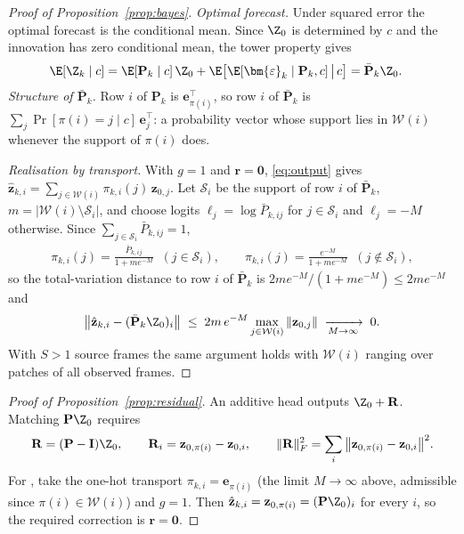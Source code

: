 \begin{proof}[Proof of Proposition~\ref{prop:bayes}]
\emph{Optimal forecast.} Under squared error the optimal forecast is the conditional mean. Since $\Z_0$ is determined
by $c$ and the innovation has zero conditional mean, the tower property gives
\begin{align}
\E[\Z_k\mid c]
  &= \E[\mathbf{P}_k\mid c]\,\Z_0+\E\big[\E[\bm{\varepsilon}_k\mid\mathbf{P}_k,c]\,\big|\,c\big]
   = \bar{\mathbf{P}}_k\Z_0 .
\end{align}
\emph{Structure of $\bar{\mathbf{P}}_k$.} Row $i$ of $\mathbf{P}_k$ is $\mathbf{e}_{\pi(i)}^{\top}$, so row $i$ of
$\bar{\mathbf{P}}_k$ is $\sum_{j}\Pr[\pi(i)=j\mid c]\,\mathbf{e}_j^{\top}$: a probability vector whose support lies in
$\mathcal{W}(i)$ whenever the support of $\pi(i)$ does.

\emph{Realisation by transport.} With $g=1$ and $\mathbf{r}=\mathbf{0}$, \cref{eq:output} gives
$\hat{\mathbf{z}}_{k,i}=\sum_{j\in\mathcal{W}(i)}\pi_{k,i}(j)\,\mathbf{z}_{0,j}$. Let $\mathcal{S}_i$ be the support of
row $i$ of $\bar{\mathbf{P}}_k$, $m=|\mathcal{W}(i)\setminus\mathcal{S}_i|$, and choose logits
$\ell_j=\log\bar{P}_{k,ij}$ for $j\in\mathcal{S}_i$ and $\ell_j=-M$ otherwise. Since $\sum_{j\in\mathcal{S}_i}\bar{P}_{k,ij}=1$,
\begin{align}
\pi_{k,i}(j)=\frac{\bar{P}_{k,ij}}{1+m e^{-M}}\;\;(j\in\mathcal{S}_i),\qquad
\pi_{k,i}(j)=\frac{e^{-M}}{1+m e^{-M}}\;\;(j\notin\mathcal{S}_i),
\end{align}
so the total-variation distance to row $i$ of $\bar{\mathbf{P}}_k$ is $2me^{-M}/(1+me^{-M})\le 2me^{-M}$ and
\begin{align}
\big\|\hat{\mathbf{z}}_{k,i}-(\bar{\mathbf{P}}_k\Z_0)_i\big\|\;\le\;2m\,e^{-M}\max_{j\in\mathcal{W}(i)}\|\mathbf{z}_{0,j}\|
\;\xrightarrow[M\to\infty]{}\;0 .
\end{align}
With $S>1$ source frames the same argument holds with $\mathcal{W}(i)$ ranging over patches of all observed frames.
\end{proof}

\begin{proof}[Proof of Proposition~\ref{prop:residual}]
An additive head outputs $\Z_0+\mathbf{R}$. Matching $\mathbf{P}\Z_0$ requires
\begin{align}
\mathbf{R}=(\mathbf{P}-\mathbf{I})\Z_0,\qquad
\mathbf{R}_{i}=\mathbf{z}_{0,\pi(i)}-\mathbf{z}_{0,i},\qquad
\|\mathbf{R}\|_F^2=\sum_i\big\|\mathbf{z}_{0,\pi(i)}-\mathbf{z}_{0,i}\big\|^2 .
\end{align}
For \ours{}, take the one-hot transport $\pi_{k,i}=\mathbf{e}_{\pi(i)}$ (the limit $M\to\infty$ above, admissible since
$\pi(i)\in\mathcal{W}(i)$) and $g=1$. Then $\hat{\mathbf{z}}_{k,i}=\mathbf{z}_{0,\pi(i)}=(\mathbf{P}\Z_0)_i$ for every $i$,
so the required correction is $\mathbf{r}=\mathbf{0}$.
\end{proof}

